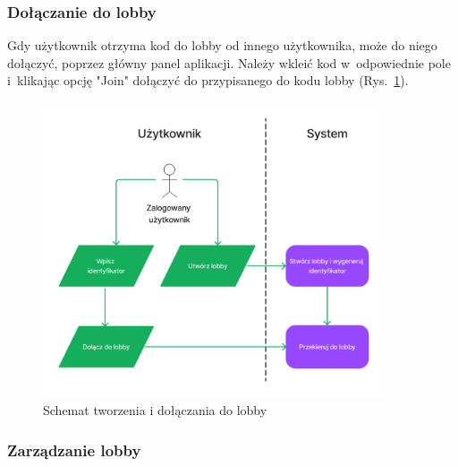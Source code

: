\subsubsection{Dołączanie do lobby}

Gdy użytkownik otrzyma kod do lobby od innego użytkownika, może
do niego dołączyć, poprzez główny panel aplikacji. Należy wkleić
kod w~odpowiednie pole i~klikając opcję "Join"\xspace
dołączyć do przypisanego do kodu lobby (Rys.~\ref{fig:figma_xd_create_join_lobby}).

\begin{figure}[hbt!]
  \centering
  \includegraphics[width=0.9\textwidth]{img/schematy/create_join_lobby.png}
  \caption{Schemat tworzenia i dołączania do lobby}
  \label{fig:figma_xd_create_join_lobby}
\end{figure}

\FloatBarrier


\subsubsection{Zarządzanie lobby}

